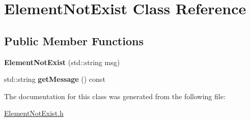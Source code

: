 \hypertarget{class_element_not_exist}{\section{Element\-Not\-Exist Class Reference}
\label{class_element_not_exist}
}
\subsection*{Public Member Functions}
\begin{DoxyCompactItemize}
\item 
\hypertarget{class_element_not_exist_a4306cc674e6e8ede2bb0b1f54fe12b77}{{\bfseries Element\-Not\-Exist} (std\-::string msg)}\label{class_element_not_exist_a4306cc674e6e8ede2bb0b1f54fe12b77}

\item 
\hypertarget{class_element_not_exist_a20e52bd3466441b814ed241e322e7cd8}{std\-::string {\bfseries get\-Message} () const }\label{class_element_not_exist_a20e52bd3466441b814ed241e322e7cd8}

\end{DoxyCompactItemize}


The documentation for this class was generated from the following file\-:\begin{DoxyCompactItemize}
\item 
\hyperlink{_element_not_exist_8h}{Element\-Not\-Exist.\-h}\end{DoxyCompactItemize}
